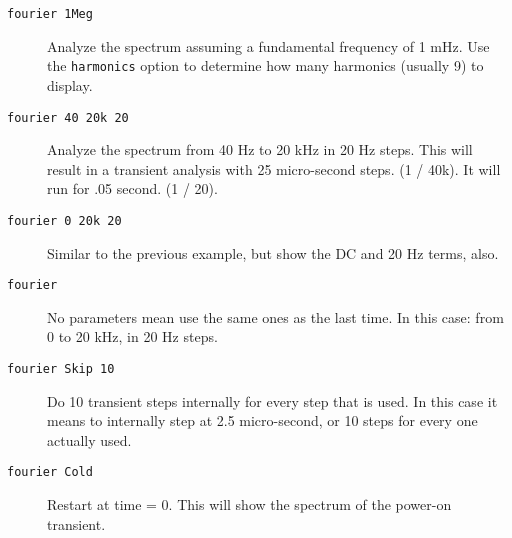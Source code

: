 \begin{description}

\item[{\tt fourier 1Meg}] Analyze the spectrum assuming a fundamental
frequency of 1 mHz.  Use the {\tt harmonics} option to determine
how many harmonics (usually 9) to display.

\item[{\tt fourier 40 20k 20}] Analyze the spectrum from 40 Hz to 20 kHz in
20 Hz steps.  This will result in a transient analysis with 25 micro-second
steps.  (1 / 40k).  It will run for .05 second.  (1 / 20).

\item[{\tt fourier 0 20k 20}] Similar to the previous example, but show the
DC and 20 Hz terms, also.

\item[{\tt fourier}] No parameters mean use the same ones as the last time.
In this case: from 0 to 20 kHz, in 20 Hz steps.

\item[{\tt fourier Skip 10}] Do 10 transient steps internally for every step
that is used.  In this case it means to internally step at 2.5 micro-second,
or 10 steps for every one actually used.

\item[{\tt fourier Cold}] Restart at time = 0.  This will show the
spectrum of the power-on transient.



\end{description}
